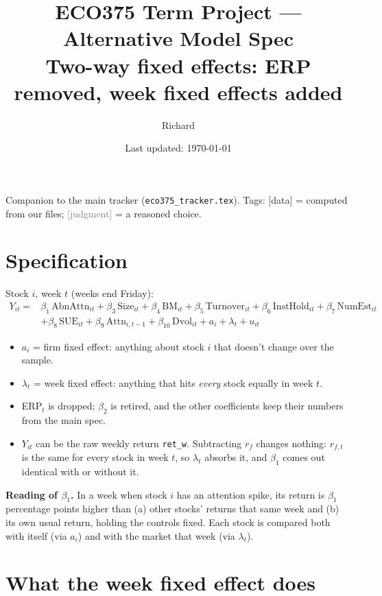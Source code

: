 \documentclass[11pt]{article}
\title{ECO375 Term Project --- Alternative Model Spec\\[2pt]\large Two-way fixed effects: ERP removed, week fixed effects added}
\author{Richard}
\date{Last updated: \today}
\newcommand{\data}{\textcolor{NavyBlue}{\textsf{[data]}}}
\newcommand{\judg}{\textcolor{Gray}{\textsf{[judgment]}}}
\newcommand{\var}[1]{\texttt{#1}}
\begin{document}
\maketitle

\noindent Companion to the main tracker (\var{eco375\_tracker.tex}). Tags: \data{} = computed from our files; \judg{} = a reasoned choice.

\section{Specification}

Stock $i$, week $t$ (weeks end Friday):
\begin{align*}
Y_{it} = {}& \beta_1\,\text{AbnAttn}_{it} + \beta_3\,\text{Size}_{it} + \beta_4\,\text{BM}_{it} + \beta_5\,\text{Turnover}_{it} + \beta_6\,\text{InstHold}_{it} + \beta_7\,\text{NumEst}_{it}\\
&+ \beta_8\,\text{SUE}_{it} + \beta_9\,\text{Attn}_{i,t-1} + \beta_{10}\,\text{Dvol}_{it} + a_i + \lambda_t + u_{it}
\end{align*}

\begin{itemize}
  \item $a_i$ = firm fixed effect: anything about stock $i$ that doesn't change over the sample.
  \item $\lambda_t$ = week fixed effect: anything that hits \emph{every} stock equally in week $t$.
  \item ERP$_t$ is dropped; $\beta_2$ is retired, and the other coefficients keep their numbers from the main spec.
  \item $Y_{it}$ can be the raw weekly return \var{ret\_w}. Subtracting $r_f$ changes nothing: $r_{f,t}$ is the same for every stock in week $t$, so $\lambda_t$ absorbs it, and $\beta_1$ comes out identical with or without it.
\end{itemize}

\textbf{Reading of $\beta_1$.} In a week when stock $i$ has an attention spike, its return is $\beta_1$ percentage points higher than (a) other stocks' returns that same week and (b) its own usual return, holding the controls fixed. Each stock is compared both with itself (via $a_i$) and with the market that week (via $\lambda_t$).

\section{What the week fixed effect does}
\end{document}

